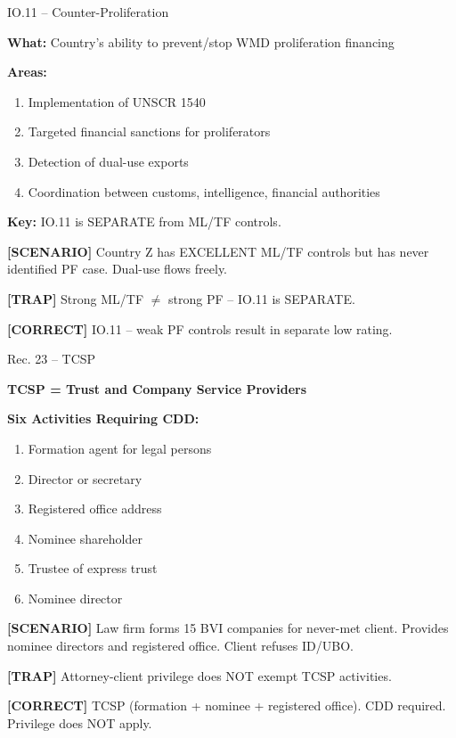 \documentclass[8pt,aspectratio=169,fontsize=7pt]{beamer}
\renewcommand{\tiny}{\fontsize{4pt}{5pt}\selectfont}
\renewcommand{\normalsize}{\fontsize{8pt}{9pt}\selectfont}
\newcommand{\trap}[1]{%
	\begin{block}{\textcolor{redtrap}{\textbf{[TRAP]}}}
		\textcolor{redtrap}{\tiny #1}
	\end{block}
}
\newcommand{\scenario}[1]{%
	\begin{block}{\textbf{[SCENARIO]}}
		\tiny #1
	\end{block}
}
\newcommand{\correct}[1]{%
	\begin{block}{\textcolor{greencorrect}{\textbf{[CORRECT]}}}
		\textcolor{greencorrect}{\tiny #1}
	\end{block}
}
\begin{document}
	\begin{frame}{\normalsize IO.11 -- Counter-Proliferation}
		
		\textbf{What:} Country's ability to prevent/stop WMD proliferation financing
		
		\textbf{Areas:}
		\begin{enumerate}
			\item Implementation of UNSCR 1540
			\item Targeted financial sanctions for proliferators
			\item Detection of dual-use exports
			\item Coordination between customs, intelligence, financial authorities
		\end{enumerate}
		
		\textbf{Key:} IO.11 is SEPARATE from ML/TF controls.
		
		\scenario{Country Z has EXCELLENT ML/TF controls but has never identified PF case. Dual-use flows freely.}
		
		\trap{Strong ML/TF $\neq$ strong PF -- IO.11 is SEPARATE.}
		
		\correct{IO.11 -- weak PF controls result in separate low rating.}
	\end{frame}
	
	\begin{frame}{\normalsize Rec. 23 -- TCSP}
		
		\textbf{TCSP = Trust and Company Service Providers}
		
		\textbf{Six Activities Requiring CDD:}
		\begin{enumerate}
			\item Formation agent for legal persons
			\item Director or secretary
			\item Registered office address
			\item Nominee shareholder
			\item Trustee of express trust
			\item Nominee director
		\end{enumerate}
		
		\scenario{Law firm forms 15 BVI companies for never-met client. Provides nominee directors and registered office. Client refuses ID/UBO.}
		
		\trap{Attorney-client privilege does NOT exempt TCSP activities.}
		
		\correct{TCSP (formation + nominee + registered office). CDD required. Privilege does NOT apply.}
	\end{frame}
	
\end{document}
